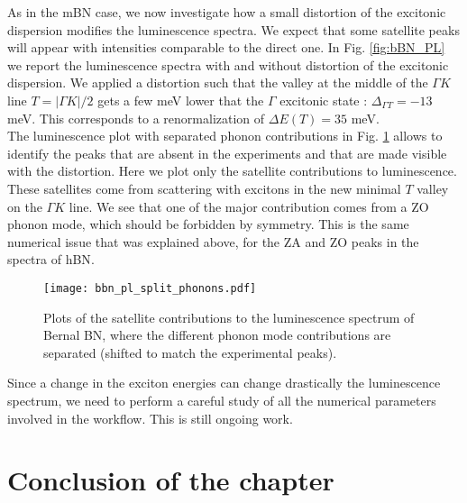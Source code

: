 As in the \acrshort{mBN} case, we now investigate how a small distortion of the excitonic dispersion modifies the luminescence spectra. We expect that some satellite peaks will appear with intensities comparable to the direct one. In Fig. \ref{fig:bBN_PL} we report the luminescence spectra with and without distortion of the excitonic dispersion. We applied a distortion such that the valley at the middle of the $\Gamma K$ line $T = |\Gamma K|/2$ gets a few meV lower that the $\Gamma$ excitonic state : $\Delta_{\Gamma T} = -13$ meV. This corresponds to a renormalization of $\Delta E(T) = 35$ meV. \\
The luminescence plot with separated phonon contributions in Fig. \ref{fig:bBN_PL_split_phonons} allows to identify the peaks that are absent in the experiments and that are made visible with the distortion. Here we plot only the satellite contributions to luminescence. These satellites come from scattering with excitons in the new minimal $T$ valley on the $\Gamma K$ line. We see that one of the major contribution comes from a ZO phonon mode, which should be forbidden by symmetry. This is the same numerical issue that was explained above, for the ZA and ZO peaks in the spectra of \acrshort{hBN}.
\begin{figure}[h!b]
	\vspace{0.2cm}
	\setcapindent{2em}
	\centering
	\texttt{[image: bbn\_pl\_split\_phonons.pdf]}
	\caption{Plots of the satellite contributions to the luminescence spectrum of Bernal BN, where the different phonon mode contributions are separated (shifted to match the experimental peaks).} %
    \label{fig:bBN_PL_split_phonons}
\end{figure}

Since a change in the exciton energies can change drastically the luminescence spectrum, we need to perform a careful study of all the numerical parameters involved in the workflow. This is still ongoing work.


\section*{Conclusion of the chapter}

